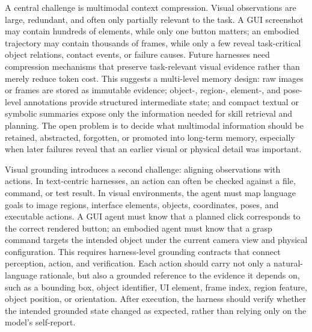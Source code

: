 \documentclass{llmxive}
\begin{document}
A central challenge is multimodal context compression. Visual observations are large, redundant, and often only partially relevant to the task. A GUI screenshot may contain hundreds of elements, while only one button matters; an embodied trajectory may contain thousands of frames, while only a few reveal task-critical object relations, contact events, or failure causes. Future harnesses need compression mechanisms that preserve task-relevant visual evidence rather than merely reduce token cost. This suggests a multi-level memory design: raw images or frames are stored as immutable evidence; object-, region-, element-, and pose-level annotations provide structured intermediate state; and compact textual or symbolic summaries expose only the information needed for skill retrieval and planning. The open problem is to decide what multimodal information should be retained, abstracted, forgotten, or promoted into long-term memory, especially when later failures reveal that an earlier visual or physical detail was important.

Visual grounding introduces a second challenge: aligning observations with actions. In text-centric harnesses, an action can often be checked against a file, command, or test result. In visual environments, the agent must map language goals to image regions, interface elements, objects, coordinates, poses, and executable actions. A GUI agent must know that a planned click corresponds to the correct rendered button; an embodied agent must know that a grasp command targets the intended object under the current camera view and physical configuration. This requires harness-level grounding contracts that connect perception, action, and verification. Each action should carry not only a natural-language rationale, but also a grounded reference to the evidence it depends on, such as a bounding box, object identifier, UI element, frame index, region feature, object position, or orientation. After execution, the harness should verify whether the intended grounded state changed as expected, rather than relying only on the model's self-report.
\end{document}
